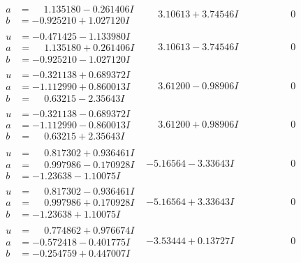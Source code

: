 \documentclass[1p]{elsarticle_modified}
\theoremstyle{definition}
\begin{document}
$$\begin{array}{c|c|c}
\begin{aligned}
a &= \phantom{-}1.135180 - 0.261406 I \\
b &= -0.925210 + 1.027120 I\end{aligned}
 & \phantom{-}3.10613 + 3.74546 I & \phantom{-0.000000 } 0 \\ \hline\begin{aligned}
u &= -0.471425 - 1.133980 I \\
a &= \phantom{-}1.135180 + 0.261406 I \\
b &= -0.925210 - 1.027120 I\end{aligned}
 & \phantom{-}3.10613 - 3.74546 I & \phantom{-0.000000 } 0 \\ \hline\begin{aligned}
u &= -0.321138 + 0.689372 I \\
a &= -1.112990 + 0.860013 I \\
b &= \phantom{-}0.63215 - 2.35643 I\end{aligned}
 & \phantom{-}3.61200 - 0.98906 I & \phantom{-0.000000 } 0 \\ \hline\begin{aligned}
u &= -0.321138 - 0.689372 I \\
a &= -1.112990 - 0.860013 I \\
b &= \phantom{-}0.63215 + 2.35643 I\end{aligned}
 & \phantom{-}3.61200 + 0.98906 I & \phantom{-0.000000 } 0 \\ \hline\begin{aligned}
u &= \phantom{-}0.817302 + 0.936461 I \\
a &= \phantom{-}0.997986 - 0.170928 I \\
b &= -1.23638 - 1.10075 I\end{aligned}
 & -5.16564 - 3.33643 I & \phantom{-0.000000 } 0 \\ \hline\begin{aligned}
u &= \phantom{-}0.817302 - 0.936461 I \\
a &= \phantom{-}0.997986 + 0.170928 I \\
b &= -1.23638 + 1.10075 I\end{aligned}
 & -5.16564 + 3.33643 I & \phantom{-0.000000 } 0 \\ \hline\begin{aligned}
u &= \phantom{-}0.774862 + 0.976674 I \\
a &= -0.572418 - 0.401775 I \\
b &= -0.254759 + 0.447007 I\end{aligned}
 & -3.53444 + 0.13727 I & \phantom{-0.000000 } 0 \\ \hline\begin{aligned}

\end{aligned}
\end{array}$$
\end{document}
